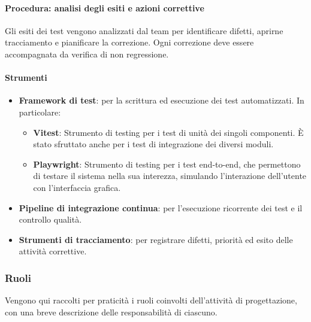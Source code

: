 \documentclass[a4paper,12pt]{article}
\begin{document}
\paragraph{Procedura: analisi degli esiti e azioni correttive}
Gli esiti dei test vengono analizzati dal team per identificare difetti,
aprirne tracciamento e pianificare la correzione. Ogni correzione deve essere
accompagnata da verifica di non regressione.

\paragraph{Strumenti}
\begin{itemize}
        \item \textbf{Framework di test}: per la scrittura ed esecuzione dei test automatizzati. In particolare:
        \begin{itemize}
            \item \textbf{Vitest}: Strumento di testing per i test di unità dei singoli componenti. È stato sfruttato anche per i test di integrazione dei diversi moduli.
            \item \textbf{Playwright}: Strumento di testing per i test end-to-end, che permettono di testare il sistema nella sua interezza, simulando l'interazione dell'utente con l'interfaccia grafica.
        \end{itemize}
        \item \textbf{Pipeline di integrazione continua}: per l'esecuzione ricorrente dei test e il controllo qualità.
        \item \textbf{Strumenti di tracciamento}: per registrare difetti, priorità ed esito delle attività correttive.
\end{itemize}

\subsubsection{Ruoli}
Vengono qui raccolti per praticità i ruoli coinvolti dell'attività di progettazione, con una breve descrizione delle responsabilità di ciascuno.
\end{document}
